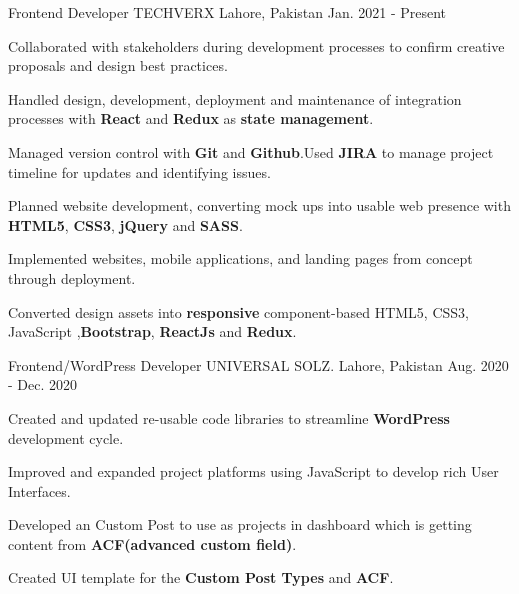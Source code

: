 

\begin{cventries}

  \cventry
    {Frontend Developer} %
    {TECHVERX} %
    {Lahore, Pakistan} %
    {Jan. 2021 - Present} %
    {
      \begin{cvitems} %
        \item {Collaborated with stakeholders during development processes to confirm creative proposals and design best practices.}
        \item {Handled design, development, deployment and maintenance of integration processes with \textbf{React} and \textbf{Redux} as \textbf{state management}.}
        \item {Managed version control with \textbf{Git} and \textbf{Github}.Used \textbf{JIRA} to manage project timeline for updates and identifying issues.}
        \item {Planned website development, converting mock ups into usable web presence with \textbf{HTML5}, \textbf{CSS3}, \textbf{jQuery} and \textbf{SASS}.}
        \item {Implemented websites, mobile applications, and landing pages from concept through deployment.}
        \item {Converted design assets into \textbf{responsive} component-based HTML5, CSS3, JavaScript ,\textbf{Bootstrap}, \textbf{ReactJs} and \textbf{Redux}.}
      \end{cvitems}
    }

  \cventry
    {Frontend/WordPress Developer} %
    {UNIVERSAL SOLZ.} %
    {Lahore, Pakistan} %
    {Aug. 2020 - Dec. 2020} %
    {
      \begin{cvitems} %
        \item {Created and updated re-usable code libraries to streamline \textbf{WordPress} development cycle.}
        \item {Improved and expanded project platforms using JavaScript to develop rich User Interfaces.}
        \item {Developed an Custom Post to use as projects in dashboard which is getting content from \textbf{ACF(advanced custom field)}.}
        \item {Created UI template for the \textbf{Custom Post Types} and \textbf{ACF}.}
      \end{cvitems}
    }


\end{cventries}
